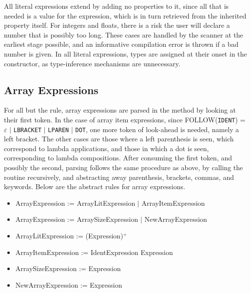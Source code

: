 All literal expressions extend  by adding no properties to it, since all that is needed is a value for the expression, which is in turn retrieved from the inherited  property itself. For integers and floats, there is a risk the user will declare a number that is possibly too long. These cases are handled by the scanner at the earliest stage possible, and an informative compilation error is thrown if a bad number is given. In all literal expressions, types are assigned at their onset in the constructor, as type-inference mechanisms are unnecessary.

\subsection{Array Expressions}

For all but the  rule, array expressions are parsed in the  method by looking at their first token. In the case of array item expressions, since FOLLOW(\texttt{IDENT}) = $\varepsilon$ $|$ \texttt{LBRACKET} $|$ \texttt{LPAREN} $|$ \texttt{DOT}, one more token of look-ahead is needed, namely a left bracket. The other cases are those where a left parenthesis is seen, which correspond to lambda applications, and those in which a dot is seen, corresponding to lambda compositions. After consuming the first token, and possibly the second, parsing follows the same procedure as above, by calling the  routine recursively, and abstracting away parenthesis, brackets, commas, and keywords. Below are the abstract rules for array expressions.

\begin{itemize}
	\item ArrayExpression := ArrayLitExpression $|$ ArrayItemExpression
	\item ArrayExpression := ArraySizeExpression $|$ NewArrayExpression
	\item ArrayLitExpression := (Expression)$^+$
	\item ArrayItemExpression := IdentExpression Expression
	\item ArraySizeExpression := Expression
	\item NewArrayExpression := Expression
\end{itemize}

